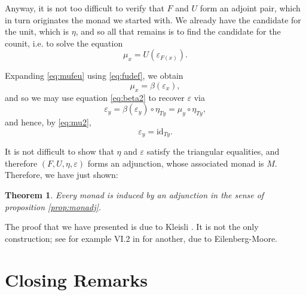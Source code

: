 \documentclass[11pt]{article}
\newtheorem{theorem}{Theorem}
\theoremstyle{nonumberplain}
\newcommand{\id}{\mathrm{id}}
\begin{document}
Anyway, it is not too difficult to verify that $F$ and $U$ form an adjoint pair, which in turn originates the monad we started with. We already have the candidate for the unit, which is $\eta$, and so all that remains is to find the candidate for the counit, i.e. to solve the equation
\begin{equation}\label{eq:mufeu}
\mu_x = U(\varepsilon_{F(x)}).
\end{equation}

Expanding \eqref{eq:mufeu} using \eqref{eq:fudef}, we obtain
\begin{equation}
\mu_x = \beta(\varepsilon_{x}),
\end{equation}
and so we may use equation \eqref{eq:beta2} to recover $\varepsilon$ via
\begin{equation}
\varepsilon_y = \beta(\varepsilon_y) \circ \eta_{Ty} = \mu_y \circ \eta_{Ty},
\end{equation}
and hence, by \eqref{eq:mu2},
\begin{equation}
\varepsilon_y = \id_{Ty}.
\end{equation}

It is not difficult to show that $\eta$ and $\varepsilon$ satisfy the triangular equalities, and therefore $(F, U, \eta, \varepsilon)$ forms an adjunction, whose associated monad is $M$. Therefore, we have just shown:

\begin{theorem}
Every monad is induced by an adjunction in the sense of proposition \ref{prop:monadj}.
\end{theorem}

The proof that we have presented is due to Kleisli \cite{kleisli}. It is not the only construction; see for example VI.2 in \cite{maclane} for another, due to Eilenberg-Moore.

\section{Closing Remarks}
\end{document}
